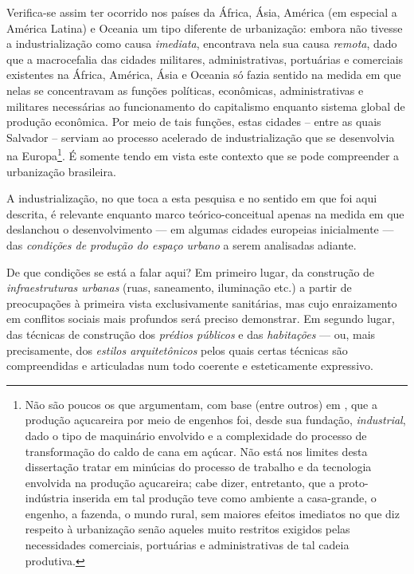Verifica-se assim ter ocorrido nos países da África, Ásia, América (em especial a América Latina) e Oceania um tipo diferente de urbanização: embora não tivesse a industrialização como causa \textit{imediata}, encontrava nela sua causa \textit{remota}, dado que a macrocefalia das cidades militares, administrativas, portuárias e comerciais existentes na África, América, Ásia e Oceania só fazia sentido na medida em que nelas se concentravam as funções políticas, econômicas, administrativas e militares necessárias ao funcionamento do capitalismo enquanto sistema global de produção econômica. Por meio de tais funções, estas cidades -- entre as quais Salvador -- serviam ao processo acelerado de industrialização que se desenvolvia na Europa\footnote{Não são poucos os que argumentam, com base (entre outros) em , que a produção açucareira por meio de engenhos foi, desde sua fundação, \textit{industrial}, dado o tipo de maquinário envolvido e a complexidade do processo de transformação do caldo de cana em açúcar. Não está nos limites desta dissertação tratar em minúcias do processo de trabalho e da tecnologia envolvida na produção açucareira; cabe dizer, entretanto, que a proto-indústria inserida em tal produção teve como ambiente a casa-grande, o engenho, a fazenda, o mundo rural, sem maiores efeitos imediatos no que diz respeito à urbanização senão aqueles muito restritos exigidos pelas necessidades comerciais, portuárias e administrativas de tal cadeia produtiva.}. É somente tendo em vista este contexto que se pode compreender a urbanização brasileira.

A industrialização, no que toca a esta pesquisa e no sentido em que foi aqui descrita, é relevante enquanto marco teórico-conceitual apenas na medida em que deslanchou o desenvolvimento --- em algumas cidades europeias inicialmente --- das \textit{condições de produção do espaço urbano} a serem analisadas adiante. 

De que condições se está a falar aqui? Em primeiro lugar, da construção de \textit{infraestruturas urbanas} (ruas, saneamento, iluminação etc.) a partir de preocupações à primeira vista exclusivamente sanitárias, mas cujo enraizamento em conflitos sociais mais profundos será preciso demonstrar. Em segundo lugar, das técnicas de construção dos \textit{prédios públicos} e das \textit{habitações} --- ou, mais precisamente, dos \textit{estilos arquitetônicos} pelos quais certas técnicas são compreendidas e articuladas num todo coerente e esteticamente expressivo.

